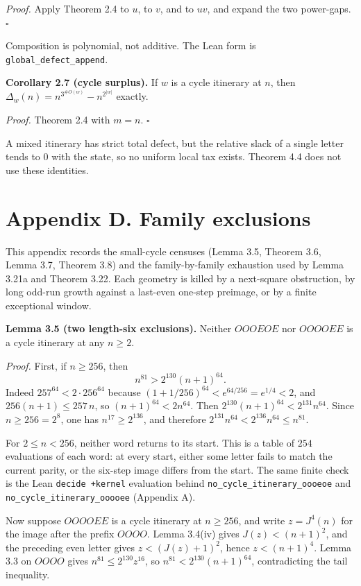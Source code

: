 \documentclass[12pt]{article}
\begin{document}
\emph{Proof.} Apply Theorem 2.4 to \(u\), to \(v\), and to \(uv\), and
expand the two power-gaps. \(\square\)

Composition is polynomial, not additive. The Lean form is
\texttt{\nolinkurl{global_defect_append}}.

\textbf{Corollary 2.7 (cycle surplus).} If \(w\) is a cycle itinerary at
\(n\), then \(\Delta_w(n)=n^{3^{\#O(w)}}-n^{2^{|w|}}\) exactly.

\emph{Proof.} Theorem 2.4 with \(m=n\). \(\square\)

A mixed itinerary has strict total defect, but the relative slack of a
single letter tends to \(0\) with the state, so no uniform local tax
exists. Theorem 4.4 does not use these identities.

\section{Appendix D. Family
exclusions}\label{appendix-d.-family-exclusions}

This appendix records the small-cycle censuses (Lemma 3.5, Theorem 3.6,
Lemma 3.7, Theorem 3.8) and the family-by-family exhaustion used by
Lemma 3.21a and Theorem 3.22. Each geometry is killed by a next-square
obstruction, by long odd-run growth against a last-even one-step
preimage, or by a finite exceptional window.

\textbf{Lemma 3.5 (two length-six exclusions).} Neither \(OOOEOE\) nor
\(OOOOEE\) is a cycle itinerary at any \(n\ge 2\).

\emph{Proof.} First, if \(n\ge 256\), then \[
n^{81}>2^{130}(n+1)^{64}.
\] Indeed \(257^{64}<2\cdot 256^{64}\) because
\((1+1/256)^{64}<e^{64/256}=e^{1/4}<2\), and \(256(n+1)\le 257\,n\), so
\((n+1)^{64}<2n^{64}\). Then \(2^{130}(n+1)^{64}<2^{131}n^{64}\). Since
\(n\ge 256=2^8\), one has \(n^{17}\ge 2^{136}\), and therefore
\(2^{131}n^{64}<2^{136}n^{64}\le n^{81}\).

For \(2\le n<256\), neither word returns to its start. This is a table
of \(254\) evaluations of each word: at every start, either some letter
fails to match the current parity, or the six-step image differs from
the start. The same finite check is the Lean \texttt{decide\ +kernel}
evaluation behind \texttt{\nolinkurl{no_cycle_itinerary_oooeoe}} and
\texttt{\nolinkurl{no_cycle_itinerary_ooooee}} (Appendix A).

Now suppose \(OOOOEE\) is a cycle itinerary at \(n\ge 256\), and write
\(z=J^4(n)\) for the image after the prefix \(OOOO\). Lemma 3.4(iv)
gives \(J(z)<(n+1)^2\), and the preceding even letter gives
\(z<(J(z)+1)^2\), hence \(z<(n+1)^4\). Lemma 3.3 on \(OOOO\) gives
\(n^{81}\le 2^{130}z^{16}\), so \(n^{81}<2^{130}(n+1)^{64}\),
contradicting the tail inequality.
\end{document}
